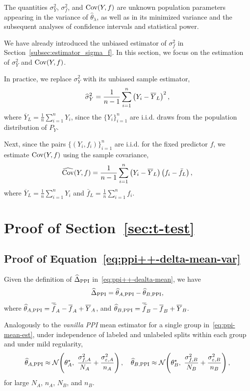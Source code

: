 The quantities $\sigma_Y^2$, $\sigma_f^2$, and $\mathrm{Cov}(Y,f)$ are unknown population parameters appearing in the variance of $\widehat{\theta}_\lambda$, as well as in its minimized variance and the subsequent analyses of confidence intervals and statistical power.

\noindent
We have already introduced the unbiased estimator of $\sigma_f^2$ in Section~\ref{subsec:estimator_sigma_f}.
In this section, we focus on the estimation of $\sigma_Y^2$ and $\mathrm{Cov}(Y,f)$.

\noindent
In practice, we replace $\sigma_Y^2$ with its unbiased sample estimator,\[
\widehat{\sigma}_Y^2
= \frac{1}{n - 1}
\sum_{i = 1}^n
\left(Y_i - \overline{Y}_L\right)^2,\]
where
$\overline{Y}_L = \frac{1}{n}\sum_{i = 1}^n Y_i$, since the $\{Y_i\}_{i=1}^n$ are i.i.d. draws from the population distribution of $P_Y$.

\noindent
Next, since the pairs $\{\left(Y_i,f_i\right)\}^n_{i=1}$ are i.i.d. for the fixed predictor $f$, we estimate $\mathrm{Cov}(Y,f)$ using the sample covariance,\[
\widehat {\mathrm{Cov}}(Y,f) = \frac{1}{n-1}\sum^n_{i=1}\left(Y_i-\overline{Y}_L\right)\left(f_i-\bar f_L\right),
\]where $\overline{Y}_L=\frac{1}{n}\sum^n_{i=1} Y_i$ and $\bar{f}_L=\frac{1}{n}\sum^n_{i=1} f_i$.

\section{Proof of Section~\ref{sec:t-test}}
\subsection{Proof of Equation~\eqref{eq:ppi++-delta-mean-var}}

Given the definition of $\widehat\Delta_{\mathrm{PPI}}$ in~\eqref{eq:ppi++-dealta-mean}, we have
\[\widehat\Delta_{\mathrm{PPI}}={\widehat{\theta}_{A,\mathrm{PPI}}}-{\widehat{\theta}_{B,\mathrm{PPI}}},\]where ${\widehat{\theta}_{A,\mathrm{PPI}}}=\overline{\widetilde f}_A - \overline{ f}_A + \overline{Y}_A$, and ${\widehat{\theta}_{B,\mathrm{PPI}}}=\overline{\widetilde f}_B - \overline{ f}_B + \overline{Y}_B$.

\noindent
Analogously to the \emph{vanilla PPI} mean estimator for a single group in~\eqref{eq:ppi-mean-est}, under independence of labeled and unlabeled splits within each group and under mild regularity,
\begin{equation*}
\wh\theta_{A,\mathrm{PPI}} \approx \mathcal{N}\!\left(\theta_A^\star,\ \frac{\sigma_{f,A}^2}{N_A} + \frac{\sigma_{\varepsilon,A}^2}{n_A}\right),\quad
\wh\theta_{B,\mathrm{PPI}} \approx \mathcal{N}\!\left(\theta_B^\star,\ \frac{\sigma_{f,B}^2}{N_B} + \frac{\sigma_{\varepsilon,B}^2}{n_B}\right),
\end{equation*}for large $N_A$, $n_A$, $N_B$, and $n_B$.

